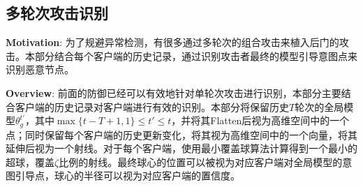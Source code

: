 \documentclass[lettersize,journal]{IEEEtran}
\begin{document}
\subsection{多轮次攻击识别}

\textbf{Motivation}: 为了规避异常检测，有很多通过多轮次的组合攻击来植入后门的攻击。本部分结合每个客户端的历史记录，通过识别攻击者最终的模型引导意图点来识别恶意节点。

\textbf{Overview}: 前面的防御已经可以有效地针对单轮次攻击进行识别，本部分主要结合客户端的历史记录对客户端进行有效的识别。本部分将保留历史$T$轮次的全局模型$\theta_g^{t'}$，其中$\max\{t-T+1, 1\}\leq  t'\leq t$，并将其Flatten后视为高维空间中的一个点；同时保留每个客户端的历史更新变化，将其视为高维空间中的一个向量，将其延伸后视为一个射线。对于每个客户端，使用最小覆盖球算法计算得到一个最小的超球，覆盖$\zeta$比例的射线。最终球心的位置可以被视为对应客户端对全局模型的意图引导点，球心的半径可以视为对应客户端的置信度。
\end{document}
